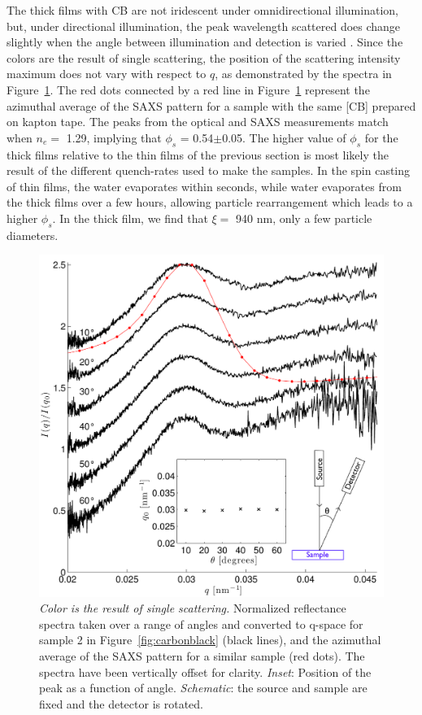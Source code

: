 The thick films with CB are not iridescent under omnidirectional illumination, but, under directional illumination, the peak wavelength scattered does change slightly when the angle between illumination and detection is varied \cite{Noh:2009AM}. 
Since the colors are the result of single scattering, the position of the scattering intensity maximum does not vary with respect to $q$, as demonstrated by the spectra in Figure~\ref{fig:qseries}.
The red dots connected by a red line in Figure~\ref{fig:qseries} represent the azimuthal average of the SAXS pattern for a sample with the same [CB] prepared on kapton tape.  The peaks from the optical and SAXS measurements match when $n_{e} = $ 1.29, implying that $\phi_{s}$ = 0.54$\pm$0.05.
The higher value of $\phi_{s}$ for the thick films relative to the thin films of the previous section is most likely the result of the different quench-rates used to make the samples.
In the spin casting of thin films, the water evaporates within seconds, while water evaporates from the thick films over a few hours, allowing particle rearrangement which leads to a higher $\phi_s$.
In the thick film, we find that $\xi = $ 940 nm, only a few particle diameters.


\begin{figure}[htbp]
\centering
\includegraphics[width=.9\textwidth]{figures/qseries_100128.pdf}
\caption{\label{fig:qseries} \emph{Color is the result of single scattering.} 			Normalized reflectance spectra taken over a range of angles and converted to q-space for sample 2 in Figure~\ref{fig:carbonblack} (black lines), and the azimuthal average of the SAXS pattern for a similar sample (red dots). The spectra have been vertically offset for clarity. \emph{Inset}: Position of the peak as a function of angle. \emph{Schematic}: the source and sample are fixed and the detector is rotated.}
\end{figure}


